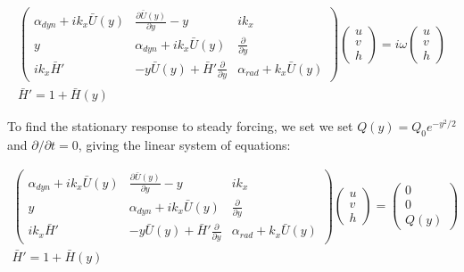   \begin{equation}\label{eqn:free-sw-shear}
    \begin{gathered}
      \begin{pmatrix}
      \alpha_{dyn} + i k_{x}\bar{U}(y) & \frac{\partial\bar{U}(y)}{\partial y}-y & i k_{x} \\
      y & \alpha_{dyn} + i k_{x}\bar{U}(y) & \frac{\partial}{\partial y} \\
      i k_{x} \bar{H}' & -y \bar{U}(y) + \bar{H}' \frac{\partial}{\partial y} & \alpha_{rad} + k_{x}\bar{U}(y)
      \end{pmatrix}
      \begin{pmatrix}
      u \\
      v \\
      h
      \end{pmatrix}
      =
      i \omega
      \begin{pmatrix}
      u \\
      v \\
      h
      \end{pmatrix} \\
        \bar{H}' = 1+\bar{H}(y)
    \end{gathered}
  \end{equation}

To find the stationary response to steady forcing, we set we set $Q(y)=Q_{0}e^{-y^{2}/2}$ \citep{matsuno1966quasi} and $\partial / \partial t = 0 $, giving the linear system of equations:


\begin{equation}\label{eqn:forced-sw-shear}
  \begin{gathered}
    \begin{pmatrix}
    \alpha_{dyn} + i k_{x}\bar{U}(y) & \frac{\partial\bar{U}(y)}{\partial y}-y & i k_{x} \\
    y & \alpha_{dyn} + i k_{x}\bar{U}(y) & \frac{\partial}{\partial y} \\
    i k_{x}\bar{H}' & -y \bar{U}(y) + \bar{H}' \frac{\partial}{\partial y} & \alpha_{rad} + k_{x}\bar{U}(y)
    \end{pmatrix}
    \begin{pmatrix}
    u \\
    v \\
    h
    \end{pmatrix}
    =
    \begin{pmatrix}
    0 \\
    0 \\
    Q(y)
    \end{pmatrix} \\
      \bar{H}' = 1+\bar{H}(y)
  \end{gathered}
\end{equation}

